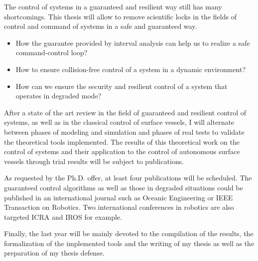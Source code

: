 \documentclass[11pt, a4paper]{awesome-cv}
\begin{document}
\begin{cvletter}

			The control of systems in a guaranteed and resilient way still has many shortcomings. This thesis will allow to remove scientific locks in the fields of control and command of systems in a safe and guaranteed way.

			\begin{itemize}[noitemsep,topsep=0pt,parsep=0pt,partopsep=0pt]
				\item How the guarantee provided by interval analysis can help us to realize a safe command-control loop?
				\item How to ensure collision-free control of a system in a dynamic environment?
				\item How can we ensure the security and resilient control of a system that operates in degraded mode?
			\end{itemize}

		

			After a state of the art review in the field of guaranteed and resilient control of systems, as well as in the classical control of surface vessels, I will alternate between phases of modeling and simulation and phases of real tests to validate the theoretical tools implemented. The results of this theoretical work on the control of systems and their application to the control of autonomous surface vessels through trial results will be subject to publications.
			
			As requested by the Ph.D. offer, at least four publications will be scheduled. The guaranteed control algorithms as well as those in degraded situations could be published in an international journal such as Oceanic Engineering or IEEE Transaction on Robotics. Two international conferences in robotics are also targeted \textsc{ICRA} and \textsc{IROS} for example.

			Finally, the last year will be mainly devoted to the compilation of the results, the formalization of the implemented tools and the writing of my thesis as well as the preparation of my thesis defense.

\end{cvletter}
\end{document}
